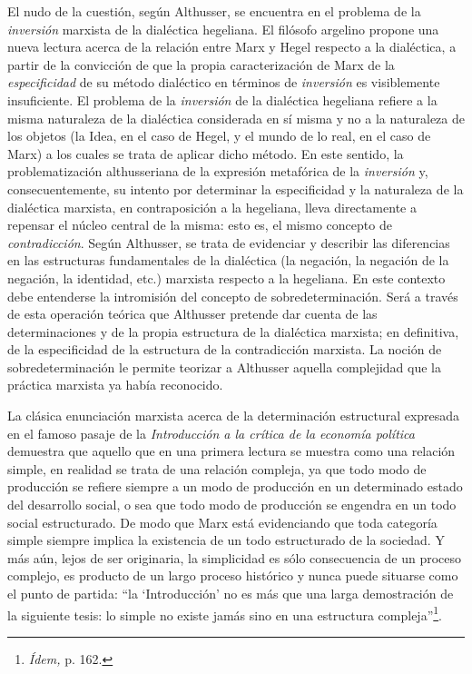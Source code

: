 El nudo de la cuestión, según Althusser, se encuentra en el problema de la \emph{inversión} marxista de la dialéctica hegeliana. El filósofo argelino propone una nueva lectura acerca de la relación entre Marx y Hegel respecto a la dialéctica, a partir de la convicción de que la propia caracterización de Marx de la \emph{especificidad} de su método dialéctico en términos de \emph{inversión} es visiblemente insuficiente. El problema de la \emph{inversión} de la dialéctica hegeliana refiere a la misma naturaleza de la dialéctica considerada en sí misma y no  a la naturaleza de los objetos (la Idea, en el caso de Hegel, y el mundo de lo real, en el caso de Marx) a los cuales se trata de aplicar dicho método. En este sentido, la problematización althusseriana de la expresión metafórica de la \emph{inversión} y, consecuentemente, su intento por determinar la especificidad y la naturaleza de la dialéctica marxista, en contraposición a la hegeliana, lleva directamente a repensar el núcleo central de la misma: esto es, el mismo concepto de \emph{contradicción}. Según Althusser, se trata de evidenciar y describir las diferencias en las estructuras fundamentales de la dialéctica (la negación, la negación de la negación, la identidad, etc.) marxista respecto a la hegeliana. En este contexto debe entenderse la intromisión del concepto de sobredeterminación. Será a través de esta operación teórica que Althusser pretende dar cuenta de las determinaciones y de la propia estructura de la dialéctica marxista; en definitiva, de la especificidad de la estructura de la contradicción marxista. La noción de sobredeterminación le permite teorizar a Althusser aquella complejidad que la práctica marxista ya había reconocido.

La clásica enunciación marxista acerca de la determinación estructural expresada en el famoso pasaje de la \emph{Introducción a la crítica de la economía política} demuestra que aquello que en una primera lectura se muestra como una relación simple, en realidad se trata de una relación compleja, ya que todo modo de producción se refiere siempre a un modo de producción en un determinado estado del desarrollo social, o sea que todo modo de producción se engendra en un todo social estructurado. De modo que Marx está evidenciando que toda categoría simple siempre implica la existencia de un todo estructurado de la sociedad. Y más aún, lejos de ser originaria, la simplicidad es sólo consecuencia de un proceso complejo, es producto de un largo proceso histórico y nunca puede situarse como el punto de partida: \enquote{la \enquote{Introducción} no es más que una larga demostración de la siguiente tesis: lo simple no existe jamás sino en una estructura compleja}\footnote{\emph{Ídem,} p. 162.}.

